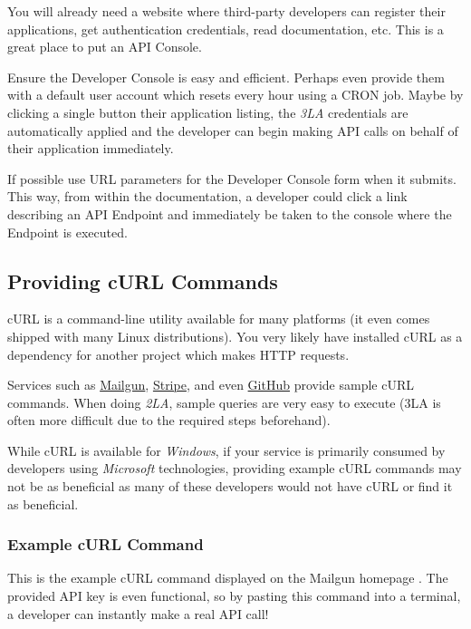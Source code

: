 \documentclass{book}
\begin{document}
You will already need a website where third-party developers can register their applications, get authentication credentials, read documentation, etc. This is a great place to put an API Console.

Ensure the Developer Console is easy and efficient. Perhaps even provide them with a default user account which resets every hour using a CRON job. Maybe by clicking a single button their application listing, the \emph{3LA} credentials are automatically applied and the developer can begin making API calls on behalf of their application immediately.

If possible use URL parameters for the Developer Console form when it submits. This way, from within the documentation, a developer could click a link describing an API Endpoint and immediately be taken to the console where the Endpoint is executed.

\subsection{Providing cURL Commands}

cURL is a command-line utility available for many platforms (it even comes shipped with many Linux distributions). You very likely have installed cURL as a dependency for another project which makes HTTP requests.

Services such as \href{http://documentation.mailgun.com/api_reference.html}{Mailgun}, \href{https://stripe.com/docs/connect/oauth}{Stripe}, and even \href{http://developer.github.com/v3/}{GitHub} provide sample cURL commands. When doing \emph{2LA}, sample queries are very easy to execute (3LA is often more difficult due to the required steps beforehand).

While cURL is available for \emph{Windows}, if your service is primarily consumed by developers using \emph{Microsoft} technologies, providing example cURL commands may not be as beneficial as many of these developers would not have cURL or find it as beneficial.

\subsubsection{Example cURL Command}

This is the example cURL command displayed on the Mailgun homepage \cite{MAILGUNHOME}. The provided API key is even functional, so by pasting this command into a terminal, a developer can instantly make a real API call!
\end{document}
